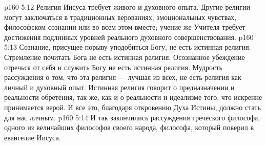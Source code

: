 \vs p160 5:12 Религия Иисуса требует живого и духовного опыта. Другие религии могут заключаться в традиционных верованиях, эмоциональных чувствах, философском сознании или во всем этом вместе; учение же Учителя требует достижения подлинных уровней реального духовного совершенствования.
\vs p160 5:13 Сознание, присущее порыву уподобиться Богу, не есть истинная религия. Стремление почитать Бога не есть истинная религия. Осознанное убеждение отречься от себя и служить Богу не есть истинная религия. Мудрость рассуждения о том, что эта религия --- лучшая из всех, не есть религия как личный и духовный опыт. Истинная религия говорит о предназначении и реальности обретения, так же, как и о реальности и идеализме того, что искренне принимается верой. И все это, благодаря откровению Духа Истины, должно стать для нас личным.
\vs p160 5:14 \pc И так закончились рассуждения греческого философа, одного из величайших философов своего народа, философа, который поверил в евангелие Иисуса.
